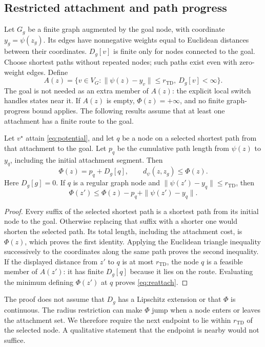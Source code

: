 \documentclass{article} %
\newcommand{\Htd}{r_{\mathrm{TD}}}
\newcommand{\dd}{d_{\psi}}
\theoremstyle{definition}
\theoremstyle{remark}
\begin{document}
\subsection{Restricted attachment and path progress}
\label{app:graph-proof}
Let $G_g$ be a finite graph augmented by the goal node, with coordinate $y_g=\psi(z_g)$.
Its edges have nonnegative weights equal to Euclidean distances between their coordinates.
$D_g[v]$ is finite only for nodes connected to the goal. Choose shortest paths without
repeated nodes; such paths exist even with zero-weight edges. Define
\[
 A(z)=\{v\in V_G:\|\psi(z)-y_v\|\le\Htd,\ D_g[v]<\infty\}.
\]
The goal is not needed as an extra member of $A(z)$: the explicit local switch handles
states near it. If $A(z)$ is empty, $\Phi(z)=+\infty$, and no finite graph-progress bound
applies. The following results assume that at least one attachment has a finite route to the goal.

\begin{lemma}
\label{lem:path-prefix}
Let $v^\star$ attain \cref{eq:potential}, and let $q$ be a node on a selected shortest
path from that attachment to the goal. Let $p_q$ be the cumulative path length from
$\psi(z)$ to $y_q$, including the initial attachment segment. Then
\begin{equation}
 \Phi(z)=p_q+D_g[q],\qquad
 \dd(z,z_g)\le\Phi(z).
 \label{eq:prefix-identity}
\end{equation}
Here $D_g[g]=0$. If $q$ is a regular graph node and
$\|\psi(z')-y_q\|\le\Htd$, then
\begin{equation}
 \Phi(z')\le\Phi(z)-p_q+\|\psi(z')-y_q\|.
 \label{eq:reattach}
\end{equation}
\end{lemma}
\begin{proof}
Every suffix of the selected shortest path is a shortest path from its initial node
to the goal. Otherwise replacing that suffix with a shorter one would shorten the
selected path. Its total length, including the attachment cost, is $\Phi(z)$, which
proves the first identity. Applying the Euclidean triangle inequality successively to
the coordinates along the same path proves the second inequality. If the displayed
distance from $z'$ to $q$ is at most $\Htd$, the node $q$ is a feasible member of $A(z')$:
it has finite $D_g[q]$ because it lies on the route. Evaluating the minimum defining
$\Phi(z')$ at $q$ proves \cref{eq:reattach}.
\end{proof}

The proof does not assume that $D_g$ has a Lipschitz extension or that $\Phi$ is continuous.
The radius restriction can make $\Phi$ jump when a node enters or leaves the attachment
set. We therefore require the next endpoint to lie within $\Htd$ of the selected node.
A qualitative statement that the endpoint is nearby would not suffice.
\end{document}
